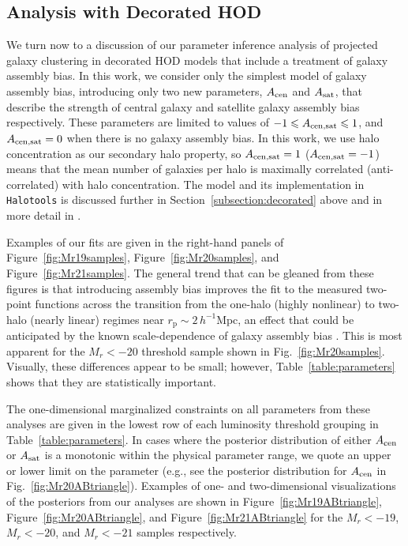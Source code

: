 \documentclass[usenatbib,usegraphicx,letterpaper]{mn2e}
\newcommand{\rp}{r_{\mathrm{p}}}
\begin{document}
\subsection{Analysis with Decorated HOD}
\label{subsection:ab}


We turn now to a discussion of our parameter inference analysis of projected galaxy clustering
in decorated HOD models that include a treatment of galaxy assembly bias. In this work,
we consider only the simplest model of galaxy assembly bias, introducing only two new
parameters, $A_{\rm cen}$ and $A_{\rm sat}$, that describe the strength of central galaxy
and satellite galaxy assembly bias respectively. These parameters are limited to values
of $-1 \le A_{\rm cen,sat} \le 1$, and $A_{\rm cen,sat}=0$ when there is no galaxy assembly bias.
In this work, we use halo concentration as our secondary halo property, so $A_{\rm cen,sat}=1$
($A_{\rm cen,sat}=-1$) means that the mean number of galaxies per halo is maximally
correlated (anti-correlated) with halo concentration. The model and its implementation
in {\tt Halotools} is discussed further in Section~\ref{subsection:decorated} above 
and in more detail in \citet{hearin_etal16}.


Examples of our fits are given in the right-hand panels of Figure~\ref{fig:Mr19samples},
Figure~\ref{fig:Mr20samples}, and Figure~\ref{fig:Mr21samples}. The general trend that
can be gleaned from these figures is that introducing assembly bias improves the fit to
the measured two-point functions across the
transition from the one-halo (highly nonlinear) to two-halo (nearly linear) regimes near 
$\rp \sim 2\, h^{-1}{\mathrm{Mpc}}$, an effect that could be anticipated by the known 
scale-dependence of galaxy assembly bias \citep{sunayama_etal16}. 
This is most apparent for the $M_r < -20$ threshold sample shown in Fig.~\ref{fig:Mr20samples}.
Visually, these differences appear to be small; however, Table~\ref{table:parameters} shows that
they are statistically important.


The one-dimensional marginalized constraints on all parameters from these analyses
are given in the lowest row of each luminosity threshold grouping in Table~\ref{table:parameters}.
In cases where the posterior distribution of either $A_{\rm cen}$ or $A_{\rm sat}$ is a monotonic within 
the physical parameter range, we quote an upper or lower limit on the parameter 
(e.g., see the posterior distribution for $A_{\rm cen}$ in Fig.~\ref{fig:Mr20ABtriangle}). 
Examples of one- and two-dimensional visualizations of the posteriors from our analyses are shown in 
Figure~\ref{fig:Mr19ABtriangle}, Figure~\ref{fig:Mr20ABtriangle}, and Figure~\ref{fig:Mr21ABtriangle} 
for the $M_r<-19$, $M_r<-20$, and $M_r<-21$ samples respectively.
\end{document}
